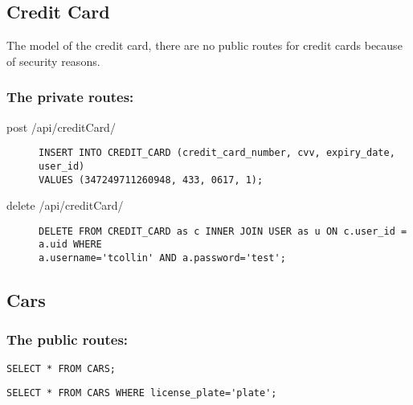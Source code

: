 \documentclass{article}
\begin{document}
\subsection{Credit Card}
The model of the credit card, there are no public routes for credit cards because of security reasons.

\subsubsection{The private routes:}
\begin{description}
\item[post /api/creditCard/] \mbox{}
\begin{lstlisting}
INSERT INTO CREDIT_CARD (credit_card_number, cvv, expiry_date, user_id)
VALUES (347249711260948, 433, 0617, 1);
\end{lstlisting}

\item[delete /api/creditCard/] \mbox{}
\begin{lstlisting}
DELETE FROM CREDIT_CARD as c INNER JOIN USER as u ON c.user_id = a.uid WHERE
a.username='tcollin' AND a.password='test';
\end{lstlisting}
\end{description}

\subsection{Cars}
\begin{description}
\subsubsection{The public routes:}
\item[post /api/cars/] \mbox{}
\begin{lstlisting}
SELECT * FROM CARS;
\end{lstlisting}
\item[post /api/cars/:plate] \mbox{}
\begin{lstlisting}
SELECT * FROM CARS WHERE license_plate='plate';
\end{lstlisting}
\end{description}
\end{document}
